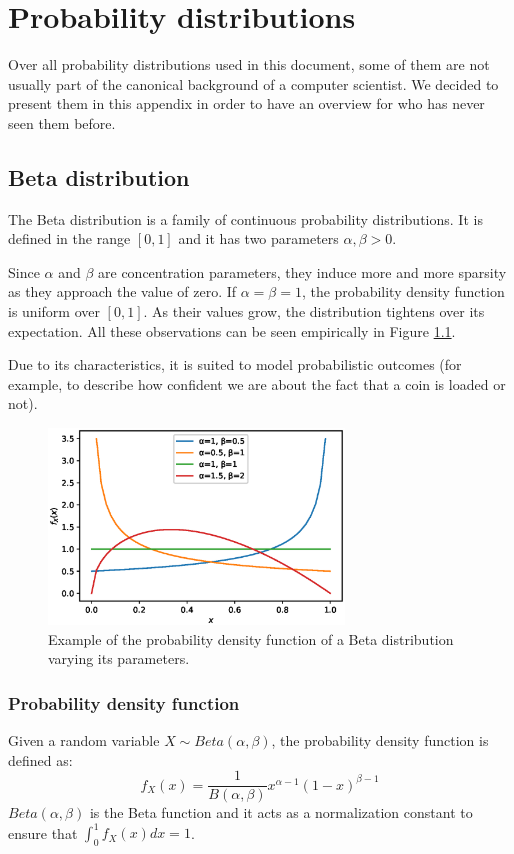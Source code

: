 \chapter{Probability distributions}
Over all probability distributions used in this document, some of them are not usually part of the canonical background of a computer scientist.
We decided to present them in this appendix in order to have an overview for who has never seen them before.

\section{Beta distribution} \label{betad}
The Beta distribution is a family of continuous probability distributions.
It is defined in the range $[0, 1]$ and it has two parameters $\alpha,\beta > 0$.

Since $\alpha$ and $\beta$ are concentration parameters, they induce more and more sparsity as they approach the value of zero.
If $\alpha = \beta = 1$, the probability density function is uniform over $[0, 1]$.
As their values grow, the distribution tightens over its expectation.
All these observations can be seen empirically in Figure \ref{fig:betaparams}.

Due to its characteristics, it is suited to model probabilistic outcomes (for example, to describe how confident we are about the fact that a coin is loaded or not).

\begin{figure}[h]
    \centering
    \includegraphics[width=0.7\textwidth]{images/beta}
    \caption{Example of the probability density function of a Beta distribution varying its parameters.}
    \label{fig:betaparams}
\end{figure}

\subsection{Probability density function}
Given a random variable $X \sim \mathit{Beta}(\alpha, \beta)$, the probability density function is defined as:
$$f_X(x) = \frac{1}{B(\alpha, \beta)}x^{\alpha - 1}(1-x)^{\beta - 1}$$
$\mathit{Beta}(\alpha, \beta)$ is the Beta function and it acts as a normalization constant to ensure that $\int_0^1 f_X(x) dx = 1$.


